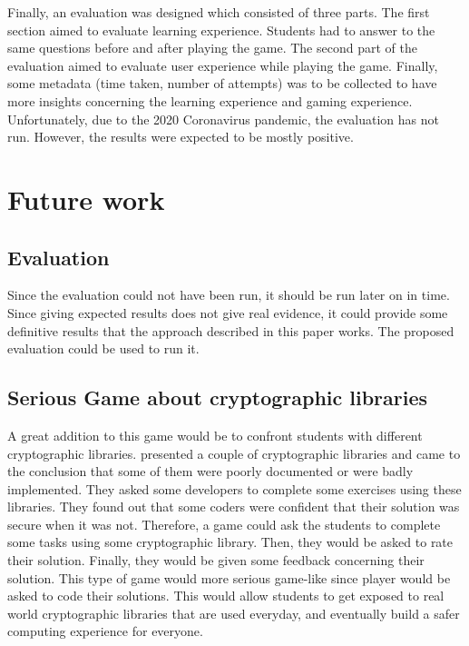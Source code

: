 \documentclass{l4proj}
\begin{document}
Finally, an evaluation was designed which consisted of three parts.
The first section aimed to evaluate learning experience.
Students had to answer to the same questions before and after playing the game.
The second part of the evaluation aimed to evaluate user experience while playing the game.
Finally, some metadata (time taken, number of attempts) was to be collected to have more insights concerning the learning experience 
and gaming experience.
Unfortunately, due to the 2020 Coronavirus pandemic, the evaluation has not run.
However, the results were expected to be mostly positive.

\section{Future work}

\subsection{Evaluation}

Since the evaluation could not have been run, it should be run later on in time.
Since giving expected results does not give real evidence,
it could provide some definitive results that the approach described in this paper works.
The proposed evaluation could be used to run it.

\subsection{Serious Game about cryptographic libraries}

A great addition to this game would be to confront students with different cryptographic libraries.
\citet{acar_comparing_2017} presented a couple of cryptographic libraries and came to the conclusion that
some of them were poorly documented or were badly implemented. 
They asked some developers to complete some exercises using these libraries.
They found out that some coders were confident that their solution was secure when it was not.
Therefore, a game could ask the students to complete some tasks using some cryptographic library.
Then, they would be asked to rate their solution. 
Finally, they would be given some feedback concerning their solution.
This type of game would more serious game-like since player would be asked to code their solutions.
This would allow students to get exposed to real world cryptographic libraries that are used everyday, 
and eventually build a safer computing experience for everyone.
\end{document}
